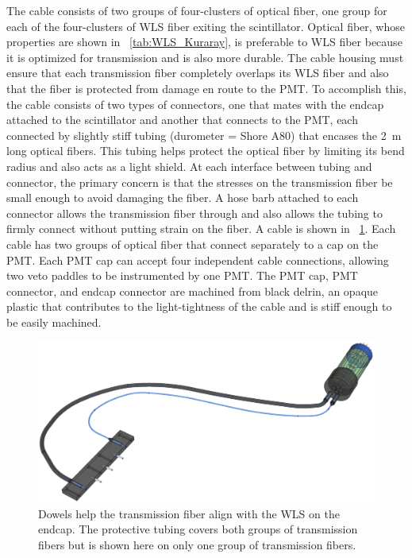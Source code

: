 The cable consists of two groups of four-clusters of optical fiber, one group for each of the four-clusters of WLS fiber exiting the scintillator.  Optical fiber, whose properties are shown in {\tab}~\ref{tab:WLS_Kuraray}, is preferable to WLS fiber because it is optimized for transmission and is also more durable.  The cable housing must ensure that each transmission fiber completely overlaps its WLS fiber and also that the fiber is protected from damage en route to the PMT.  To accomplish this, the cable consists of two types of connectors, one that mates with the endcap attached to the scintillator and another that connects to the PMT, each connected by slightly stiff tubing (durometer = Shore A80) that encases the 2~m long optical fibers.  This tubing helps protect the optical fiber by limiting its bend radius and also acts as a light shield.  At each interface between tubing and connector, the primary concern is that the stresses on the transmission fiber be small enough to avoid damaging the fiber.  A hose barb attached to each connector allows the transmission fiber through and also allows the tubing to firmly connect without putting strain on the fiber.  A cable is shown in {\fig}~\ref{fig:paddleCable}.  Each cable has two groups of optical fiber that connect separately to a cap on the PMT.  Each PMT cap can accept four independent cable connections, allowing two veto paddles to be instrumented by one PMT.  The PMT cap, PMT connector, and endcap connector are machined from black delrin, an opaque plastic that contributes to the light-tightness of the cable and is stiff enough to be easily machined.  
\begin{figure}[!htbp]
\centering
\includegraphics[width=1.0\textwidth]{figures/cable.eps}
\caption{Dowels help the transmission fiber align with the WLS on the endcap.  The protective tubing covers both groups of transmission fibers but is shown here on only one group of transmission fibers.}
\label{fig:paddleCable}
\end{figure}

